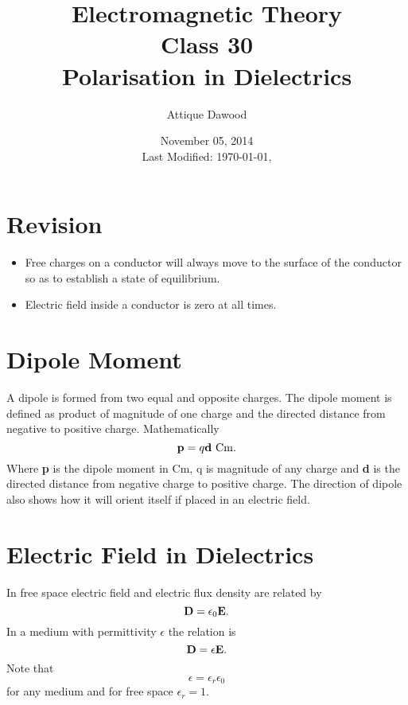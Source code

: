 \documentclass[12pt,a4paper]{article}
\title{Electromagnetic Theory\\Class 30\\Polarisation in Dielectrics}
\author{Attique Dawood}
\date{November 05, 2014\\[0.2cm] Last Modified: \today, \currenttime}
\begin{document}
\maketitle
\section{Revision}
\begin{itemize}
\item Free charges on a conductor will always move to the surface of the conductor so as to establish a state of equilibrium.
\item Electric field inside a conductor is zero at all times.
\end{itemize}
\section{Dipole Moment}
A dipole is formed from two equal and opposite charges. The dipole moment is defined as product of magnitude of one charge and the directed distance from negative to positive charge. Mathematically
\begin{equation}
\mathrm{\textbf p}=q\mathrm{\textbf d}~\mathrm{Cm}.
\end{equation}
Where \textbf{p} is the dipole moment in Cm, q is magnitude of any charge and \textbf{d} is the directed distance from negative charge to positive charge. The direction of dipole also shows how it will orient itself if placed in an electric field.
\section{Electric Field in Dielectrics}
In free space electric field and electric flux density are related by
\begin{equation}
\mathrm{\textbf D}=\epsilon_0\mathrm{\textbf E}.
\end{equation}
In a medium with permittivity $\epsilon$ the relation is
\begin{equation}
\mathrm{\textbf D}=\epsilon\mathrm{\textbf E}.
\end{equation}
Note that
\begin{equation}
\epsilon=\epsilon_r\epsilon_0
\end{equation}
for any medium and for free space $\epsilon_r=1$.
\end{document}
